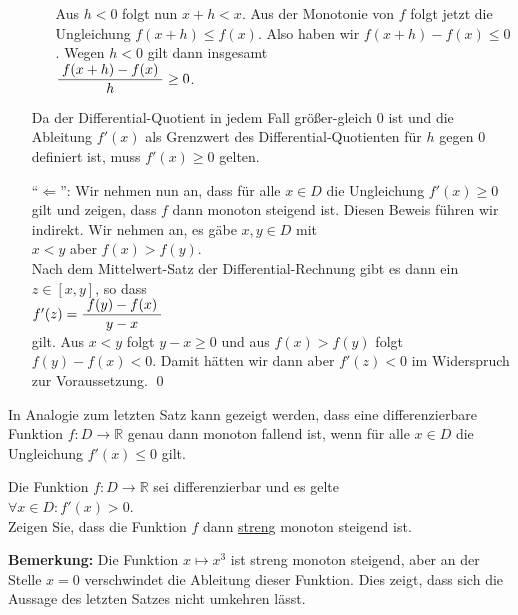 \begin{enumerate}
\begin{enumerate}[(a)]
            Aus $h < 0$ folgt nun $x + h < x$.
            Aus der Monotonie von $f$ folgt jetzt die Ungleichung 
            $f(x+h) \leq f(x)$.  Also haben wir  $f(x+h)-f(x) \leq 0$.  Wegen $h<0$ gilt dann
            insgesamt
            \\[0.3cm]
            \hspace*{1.3cm} $\displaystyle\frac{\;\displaystyle f(x+h) - f(x)\;}{\;\displaystyle h\;} \geq 0$.
      \end{enumerate}
      Da der Differential-Quotient in jedem Fall gr\"o{\ss}er-gleich $0$ ist und die Ableitung $f'(x)$ als
      Grenzwert des Differential-Quotienten f\"ur $h$ gegen $0$ definiert ist, muss $f'(x) \geq 0$
      gelten.
\item[``$\Leftarrow$'':] Wir nehmen nun an, dass f\"ur alle $x\in D$ die Ungleichung $f'(x) \geq 0$ gilt und
      zeigen, dass $f$ dann monoton steigend ist.  Diesen Beweis f\"uhren wir indirekt.
      Wir nehmen an, es g\"abe $x,y\in D$ mit 
      \\[0.2cm]
      \hspace*{1.3cm} $x < y$ \quad aber \quad $f(x) > f(y)$.
      \\[0.2cm]
      Nach dem Mittelwert-Satz der Differential-Rechnung gibt es dann ein $z\in[x,y]$, so dass
      \\[0.3cm]
      \hspace*{1.3cm} $f'(z) = \displaystyle\frac{\;\displaystyle f(y) - f(x)\;}{\;\displaystyle y - x\;}$
      \\[0.3cm]
      gilt.  Aus $x < y$ folgt  $y - x \geq 0$ und aus $f(x) > f(y)$ folgt $f(y) - f(x) <0$.
      Damit h\"atten wir dann aber $f'(z) < 0$ im Widerspruch zur Voraussetzung.
      \qed
\end{enumerate} 
\vspace*{0.1cm}

\noindent
In Analogie zum letzten Satz kann gezeigt werden, dass eine differenzierbare Funktion 
$f:D \rightarrow \mathbb{R}$ genau dann monoton
fallend ist, wenn f\"ur alle $x\in D$ die Ungleichung $f'(x) \leq 0$ gilt.

\exercise
Die Funktion $f:D \rightarrow \mathbb{R}$ sei differenzierbar und es gelte
\\[0.2cm]
\hspace*{1.3cm}
$\forall x \in D: f'(x) > 0$.
\\[0.2cm]
Zeigen Sie, dass die Funktion $f$ dann \underline{stren}g monoton steigend ist.
\vspace*{0.3cm}

\noindent
\textbf{Bemerkung:}
Die Funktion $x \mapsto x^3$ ist streng monoton steigend, aber an der Stelle $x=0$
verschwindet die Ableitung dieser Funktion.  Dies zeigt, dass sich die Aussage des letzten
Satzes nicht umkehren l\"asst. \eox


